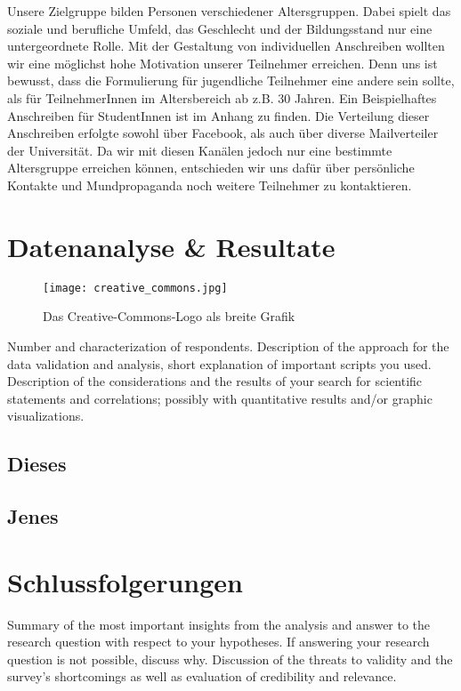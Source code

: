 \documentclass[de]{agse-empir-report}\usepackage[]{graphicx}\usepackage[]{color}
\begin{document}
Unsere Zielgruppe bilden Personen verschiedener Altersgruppen. Dabei spielt das soziale und berufliche Umfeld, das Geschlecht und der Bildungsstand nur eine untergeordnete Rolle. Mit der Gestaltung von individuellen Anschreiben wollten wir eine möglichst hohe Motivation unserer Teilnehmer erreichen. Denn uns ist bewusst, dass die Formulierung für jugendliche Teilnehmer eine andere sein sollte, als für TeilnehmerInnen im Altersbereich ab z.B. 30 Jahren. Ein Beispielhaftes Anschreiben für StudentInnen ist im Anhang zu finden. Die Verteilung dieser Anschreiben erfolgte sowohl über Facebook, als auch über diverse Mailverteiler der Universität. Da wir mit diesen Kanälen jedoch nur eine bestimmte Altersgruppe erreichen können, entschieden wir uns dafür über persönliche Kontakte und Mundpropaganda noch weitere Teilnehmer zu kontaktieren.

\section[pb]{Datenanalyse \& Resultate} \label{sec:analyse}

\begin{figure*}
    \texttt{[image: creative\_commons.jpg]}
    \caption{Das Creative-Commons-Logo als breite Grafik}
\end{figure*}

Number and characterization of respondents.
Description of the approach for the data validation and
analysis, short explanation of important scripts you used.
Description of the considerations and the results of your search for
scientific statements and correlations; possibly with quantitative
results and/or graphic visualizations.

\lipsum[5]


\subsection{Dieses}
\lipsum[6]


\subsection[mds]{Jenes}
\lipsum[7-8]


\section[hs]{Schlussfolgerungen} \label{sec:schlussfolgerung}
Summary of the most important insights from the analysis and
answer to the research question with respect to your hypotheses.
If answering your research question is not possible, discuss why.
Discussion of the threats to validity and the survey's
shortcomings as well as evaluation of credibility and relevance.
\end{document}
